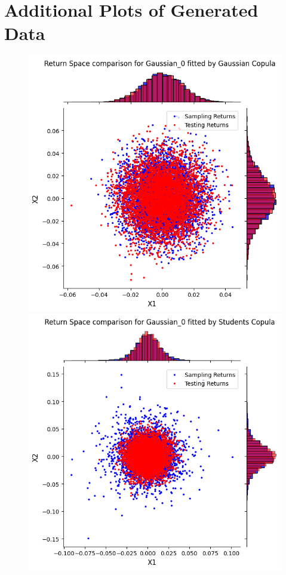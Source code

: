 \documentclass[%
a4paper,							
11pt,								
bibliography=totoc,						
abstracton=true					
]
{scrartcl}
\theoremstyle{plain}
\theoremstyle{definition}
\theoremstyle{remark}
\newcommand{\1}{\mathbbm{1}}
\begin{document}
\section{Additional Plots of Generated Data}\label{sec:CopulaResultsData}
\begin{figure}[H]
    \centering
    \begin{minipage}{0.49\textwidth}
        \centering
        \includegraphics[width=\textwidth]{5ResultsDiscussion/pictures/PortfolioTest/Port1Gauss.png}
    \end{minipage}
    \hfill
    \begin{minipage}{0.49\textwidth}
        \centering
        \includegraphics[width=\textwidth]{5ResultsDiscussion/pictures/PortfolioTest/Port1Student.png}

\end{minipage}
\end{figure}
\end{document}
